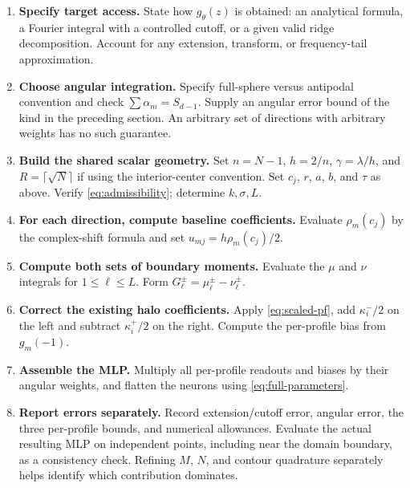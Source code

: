 \documentclass[11pt]{article}
\begin{document}
\begin{enumerate}[leftmargin=*,itemsep=6pt]
\item \textbf{Specify target access.} State how $g_\theta(z)$ is obtained: an analytical formula, a Fourier integral with a controlled cutoff, or a given valid ridge decomposition. Account for any extension, transform, or frequency-tail approximation.
\item \textbf{Choose angular integration.} Specify full-sphere versus antipodal convention and check $\sum\alpha_m=S_{d-1}$. Supply an angular error bound of the kind in the preceding section. An arbitrary set of directions with arbitrary weights has no such guarantee.
\item \textbf{Build the shared scalar geometry.} Set $n=N-1$, $h=2/n$, $\gamma=\lambda/h$, and $R=\lceil\sqrt N\rceil$ if using the interior-center convention. Set $c_j$, $r$, $a$, $b$, and $\tau$ as above. Verify \eqref{eq:admissibility}; determine $k,\sigma,L$.
\item \textbf{For each direction, compute baseline coefficients.} Evaluate $\rho_m(c_j)$ by the complex-shift formula and set $u_{mj}=h\rho_m(c_j)/2$.
\item \textbf{Compute both sets of boundary moments.} Evaluate the $\mu$ and $\nu$ integrals for $1\le\ell\le L$. Form $G_\ell^\pm=\mu_\ell^\pm-\nu_\ell^\pm$.
\item \textbf{Correct the existing halo coefficients.} Apply \eqref{eq:scaled-pf}, add $\kappa_i^-/2$ on the left and subtract $\kappa_i^+/2$ on the right. Compute the per-profile bias from $g_m(-1)$.
\item \textbf{Assemble the MLP.} Multiply all per-profile readouts and biases by their angular weights, and flatten the neurons using \eqref{eq:full-parameters}.
\item \textbf{Report errors separately.} Record extension/cutoff error, angular error, the three per-profile bounds, and numerical allowances. Evaluate the actual resulting MLP on independent points, including near the domain boundary, as a consistency check. Refining $M$, $N$, and contour quadrature separately helps identify which contribution dominates.
\end{enumerate}
\end{document}
